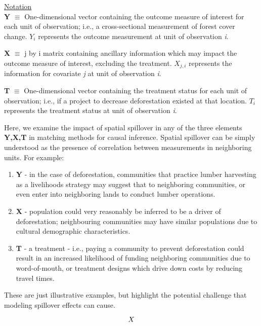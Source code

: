\documentclass[10pt,a4paper]{report}
\begin{document}
\begin{flushleft}
\underline{Notation}\\
\vspace{0.1cm}
\textbf{Y} $\equiv$ One-dimensional vector containing the outcome measure of interest for each unit of observation; i.e., a cross-sectional measurement of forest cover change. $Y_{i}$ represents the outcome measurement at unit of observation \textit{i}. 
\vspace{0.25cm}

\textbf{X} $\equiv$ j by i matrix containing ancillary information which may impact the outcome measure of interest, excluding the treatment.  $X_{j,i}$ represents the information for covariate \textit{j} at unit of observation \textit{i}.
\vspace{0.25cm}

\textbf{T} $\equiv$ One-dimensional vector containing the treatment status for each unit of observation; i.e., if a project to decrease deforestation existed at that location.  $T_{i}$ represents the treatment status at unit of observation \textit{i}. \vspace{0.25cm}

\end{flushleft}
Here, we  examine the impact of spatial spillover in any of the three elements \textbf{Y,X,T} in matching methods for causal inference.  Spatial spillover can be simply understood as the presence of correlation between measurements in neighboring units.  For example:
\begin{enumerate}
\item \textbf{Y} - in the case of deforestation,  communities that practice lumber harvesting as a livelihoods strategy may suggest that to neighboring communities, or even enter into neighboring lands to conduct lumber operations.
\item \textbf{X} - population could very reasonably be inferred to be a driver of deforestation; neighbouring communities may have similar populations due to cultural demographic characteristics.
\item \textbf{T} - a treatment - i.e., paying a community to prevent deforestation could result in an increased likelihood of funding neighboring communities due to word-of-mouth, or treatment designs which drive down costs by reducing travel times.
\end{enumerate}
These are just illustrative examples, but highlight the potential challenge that modeling spillover effects can cause.  

\begin{equation}
$$X$$
\end{equation}
\end{document}
